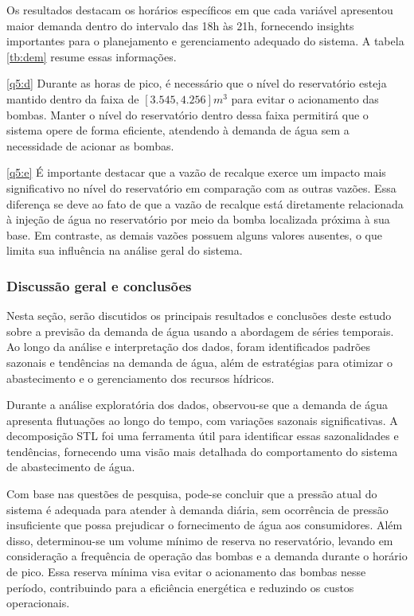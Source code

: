 Os resultados destacam os horários específicos em que cada variável apresentou maior demanda dentro do intervalo das 18h às 21h, fornecendo insights importantes para o planejamento e gerenciamento adequado do sistema. A tabela \ref{tb:dem} resume essas informações.


\ref{q5:d} Durante as horas de pico, é necessário que o nível do reservatório esteja mantido dentro da faixa de $[3.545, 4.256] m^3$ para evitar o acionamento das bombas. Manter o nível do reservatório dentro dessa faixa permitirá que o sistema opere de forma eficiente, atendendo à demanda de água sem a necessidade de acionar as bombas.

\ref{q5:e} É importante destacar que a vazão de recalque exerce um impacto mais significativo no nível do reservatório em comparação com as outras vazões. Essa diferença se deve ao fato de que a vazão de recalque está diretamente relacionada à injeção de água no reservatório por meio da bomba localizada próxima à sua base. Em contraste, as demais vazões possuem alguns valores ausentes, o que limita sua influência na análise geral do sistema.



\subsubsection{Discuss\~ao geral e conclus\~oes}

Nesta seção, serão discutidos os principais resultados e conclusões deste estudo sobre a previsão da demanda de água usando a abordagem de séries temporais. Ao longo da análise e interpretação dos dados, foram identificados padrões sazonais e tendências na demanda de água, além de estratégias para otimizar o abastecimento e o gerenciamento dos recursos hídricos.

Durante a análise exploratória dos dados, observou-se que a demanda de água apresenta flutuações ao longo do tempo, com variações sazonais significativas. A decomposição STL foi uma ferramenta útil para identificar essas sazonalidades e tendências, fornecendo uma visão mais detalhada do comportamento do sistema de abastecimento de água.

Com base nas questões de pesquisa, pode-se concluir que a pressão atual do sistema é adequada para atender à demanda diária, sem ocorrência de pressão insuficiente que possa prejudicar o fornecimento de água aos consumidores. Além disso, determinou-se um volume mínimo de reserva no reservatório, levando em consideração a frequência de operação das bombas e a demanda durante o horário de pico. Essa reserva mínima visa evitar o acionamento das bombas nesse período, contribuindo para a eficiência energética e reduzindo os custos operacionais.

